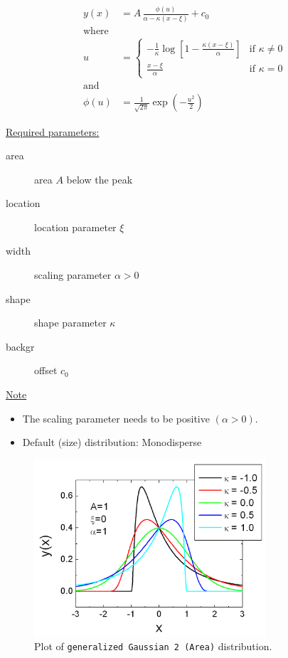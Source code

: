 \begin{subequations}
\begin{align}
y(x) &= A\, \frac{\phi(u)}{\alpha-\kappa(x-\xi)} + c_0\\
\text{where} & \nonumber \\
u &=
\begin{cases}
- \frac{1}{\kappa} \log \left[ 1-
\frac{\kappa(x-\xi)}{\alpha} \right] & \text{if } \kappa \neq 0 \\
\frac{x-\xi}{\alpha} & \text{if } \kappa=0
\end{cases} \\
\text{and} &  \nonumber \\
\phi(u) &= \frac{1}{\sqrt{2\pi}} \exp\left(-\frac{u^2}{2}\right)
\end{align}
\end{subequations}

\uline{Required parameters:}
\begin{description}
    \item[area] area $A$ below the peak
    \item[location] location parameter $\xi$
    \item[width] scaling parameter $\alpha > 0$
    \item[shape] shape parameter $\kappa$
    \item[backgr] offset $c_0$
\end{description}

\uline{Note}
\begin{itemize}
  \item The scaling parameter needs to be positive $(\alpha > 0)$.
  \item Default (size) distribution: Monodisperse
\end{itemize}

\begin{figure}[htb]
\begin{center}
\includegraphics[width=0.768\textwidth]{generalizedGaussian2Area.png}
\end{center}
\caption{Plot of \texttt{generalized Gaussian 2 (Area)}
distribution.} \label{fig:generalizedGaussian2Area}
\end{figure}

